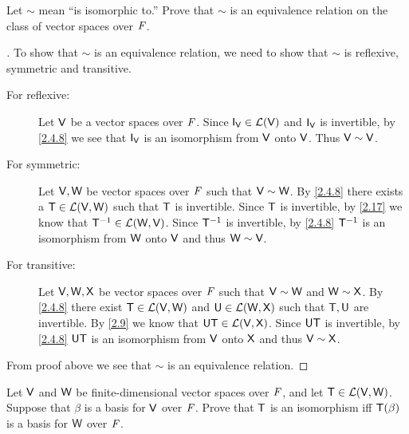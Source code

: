 \setcounter{ex}{12}
\begin{ex}\label{ex:2.4.13}
  Let \(\sim\) mean ``is isomorphic to.''
  Prove that \(\sim\) is an equivalence relation on the class of vector spaces over \(\mathit{F}\).
\end{ex}

\begin{proof}[]
  To show that \(\sim\) is an equivalence relation, we need to show that \(\sim\) is reflexive, symmetric and transitive.
  \begin{description}
    \item[For reflexive:]
      Let \(\mathsf{V}\) be a vector spaces over \(\mathit{F}\).
      Since \(\IT[\V] \in \ls(\V)\) and \(\IT[\V]\) is invertible, by \cref{2.4.8} we see that \(\IT[\V]\) is an isomorphism from \(\mathsf{V}\) onto \(\mathsf{V}\).
      Thus \(\mathsf{V} \sim \mathsf{V}\).
    \item[For symmetric:]
      Let \(\mathsf{V}, \mathsf{W}\) be vector spaces over \(\mathit{F}\) such that \(\mathsf{V} \sim \mathsf{W}\).
      By \cref{2.4.8} there exists a \(\mathsf{T} \in \mathcal{L}(\mathsf{V}, \mathsf{W})\) such that \(\mathsf{T}\) is invertible.
      Since \(\mathsf{T}\) is invertible, by \cref{2.17} we know that \(\mathsf{T}^{-1} \in \mathcal{L}(\mathsf{W}, \mathsf{V})\).
      Since \(\mathsf{T}^{-1}\) is invertible, by \cref{2.4.8} \(\mathsf{T}^{-1}\) is an isomorphism from \(\mathsf{W}\) onto \(\mathsf{V}\) and thus \(\mathsf{W} \sim \mathsf{V}\).
    \item[For transitive:]
      Let \(\mathsf{V}, \mathsf{W}, \mathsf{X}\) be vector spaces over \(\mathit{F}\) such that \(\mathsf{V} \sim \mathsf{W}\) and \(\mathsf{W} \sim \mathsf{X}\).
      By \cref{2.4.8} there exist \(\mathsf{T} \in \mathcal{L}(\mathsf{V}, \mathsf{W})\) and \(\mathsf{U} \in \mathcal{L}(\mathsf{W}, \mathsf{X})\) such that \(\mathsf{T}, \mathsf{U}\) are invertible.
      By \cref{2.9} we know that \(\mathsf{U} \mathsf{T} \in \mathcal{L}(\mathsf{V}, \mathsf{X})\).
      Since \(\mathsf{U} \mathsf{T}\) is invertible, by \cref{2.4.8} \(\mathsf{U} \mathsf{T}\) is an isomorphism from \(\mathsf{V}\) onto \(\mathsf{X}\) and thus \(\mathsf{V} \sim \mathsf{X}\).
  \end{description}
  From proof above we see that \(\sim\) is an equivalence relation.
\end{proof}

\setcounter{ex}{14}
\begin{ex}\label{ex:2.4.15}
  Let \(\mathsf{V}\) and \(\mathsf{W}\) be finite-dimensional vector spaces over \(\mathit{F}\), and let \(\mathsf{T} \in \mathcal{L}(\mathsf{V}, \mathsf{W})\).
  Suppose that \(\beta\) is a basis for \(\mathsf{V}\) over \(\mathit{F}\).
  Prove that \(\mathsf{T}\) is an isomorphism iff \(\mathsf{T}(\beta)\) is a basis for \(\mathsf{W}\) over \(\mathit{F}\).
\end{ex}

